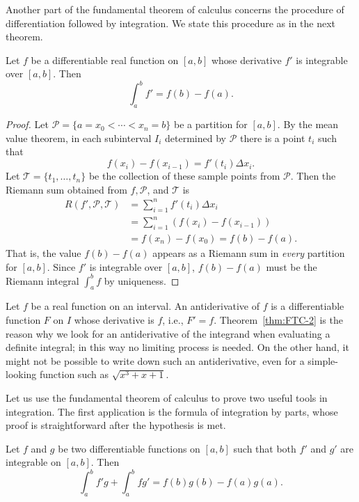 \medskip
Another part of the fundamental theorem of calculus concerns the procedure of differentiation followed by integration.
We state this procedure as in the next theorem.

\begin{thm}
  \label{thm:FTC-2}
  Let $f$ be a differentiable real function on $[a,b]$ whose derivative $f'$ is integrable over $[a,b]$.
  Then
  \[
    \int_a^b f' = f(b) - f(a).
  \]
\end{thm}

\begin{proof}
  Let $\mathcal{P} = \{ a = x_0 < \cdots < x_n = b \}$ be a partition for $[a,b]$.
  By the mean value theorem, in each subinterval $I_i$ determined by $\mathcal{P}$ there is a point $t_i$ such that
  \[
    f(x_i) - f(x_{i-1}) = f'(t_i) \Delta x_i.
  \]
  Let $\mathcal{T} = \{ t_1, \dots, t_n \}$ be the collection of these sample points from $\mathcal{P}$.
  Then the Riemann sum obtained from $f, \mathcal{P}$, and $\mathcal{T}$ is
  \begin{align*}
    R(f', \mathcal{P}, \mathcal{T}) &= \sum_{i=1}^n f'(t_i) \Delta x_i \\
    &= \sum_{i=1}^n \left( f(x_i) - f(x_{i-1}) \right) \\
    &= f(x_n) - f(x_0) = f(b) - f(a).
  \end{align*}
  That is, the value $f(b) - f(a)$ appears as a Riemann sum in {\em every} partition for $[a,b]$.
  Since $f'$ is integrable over $[a,b]$, $f(b) - f(a)$ must be the Riemann integral $\int_a^b f$ by uniqueness.
\end{proof}

Let $f$ be a real function on an interval.  An \textsf{antiderivative} of $f$ is a differentiable function $F$ on $I$ whose derivative is $f$, i.e., $F' = f$.
Theorem~\ref{thm:FTC-2} is the reason why we look for an antiderivative of the integrand when evaluating a definite integral; in this way no limiting process is needed.
On the other hand, it might not be possible to write down such an antiderivative, even for a simple-looking function such as $\sqrt{x^3 + x + 1}$.

Let us use the fundamental theorem of calculus to prove two useful tools in integration.
The first application is the formula of integration by parts, whose proof is straightforward after the hypothesis is met.

\begin{thm}
  Let $f$ and $g$ be two differentiable functions on $[a,b]$ such that both $f'$ and $g'$ are integrable on $[a,b]$.  Then
  \begin{equation}
    \label{eq:by-parts}
    \int_a^b f'g + \int_a^b fg' = f(b) g(b) - f(a) g(a).
  \end{equation}
\end{thm}

